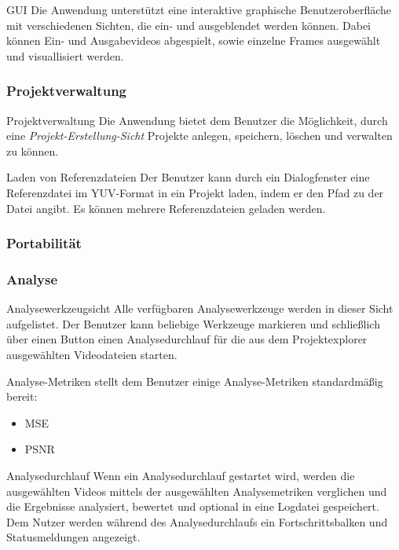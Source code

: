  GUI
\newline
Die Anwendung unterstützt eine interaktive graphische Benutzeroberfläche mit verschiedenen Sichten, die ein-
 und ausgeblendet werden können. Dabei können Ein- und Ausgabevideos abgespielt, sowie einzelne Frames
  ausgewählt und visuallisiert werden.

\subsubsection{Projektverwaltung}
 Projektverwaltung
\newline
Die Anwendung bietet dem Benutzer die Möglichkeit, durch eine \emph{Projekt-Erstellung-Sicht} Projekte
 anlegen, speichern, löschen und verwalten zu können.

 Laden von Referenzdateien
\newline
Der Benutzer kann durch ein Dialogfenster eine Referenzdatei im YUV-Format in ein Projekt laden, indem er
 den Pfad zu der Datei angibt. Es können mehrere Referenzdateien geladen werden.

\subsubsection{Portabilität}

\subsubsection{Analyse}

 Analysewerkzeugsicht
\newline
Alle verfügbaren Analysewerkzeuge werden in dieser Sicht aufgelistet. Der Benutzer kann beliebige Werkzeuge
 markieren und schließlich über einen Button einen Analysedurchlauf für die aus dem Projektexplorer
  ausgewählten Videodateien starten.


 Analyse-Metriken
\newline
\projektTitel stellt dem Benutzer einige Analyse-Metriken standardmäßig bereit:
\begin{itemize}
\item \gls{MSE}
\item \gls{PSNR}
\end{itemize}


 Analysedurchlauf
\newline
Wenn ein Analysedurchlauf gestartet wird, werden die ausgewählten Videos mittels der ausgewählten
 Analysemetriken verglichen und die Ergebnisse analysiert, bewertet und optional in eine Logdatei
  gespeichert. Dem Nutzer werden während des Analysedurchlaufs ein Fortschrittsbalken und Statusmeldungen
   angezeigt. 

